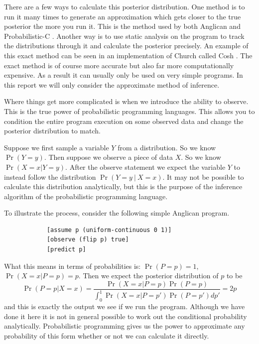\documentclass[a4paper]{article}
\begin{document}
There are a few ways to calculate this posterior distribution. One method is to run it many times to generate an approximation which gets closer to the true posterior the more you run it. This is the method used by both Anglican and Probabilistic-C \cite{Anglican, ProbabilisticC}. Another way is to use static analysis on the program to track the distributions through it and calculate the posterior precisely. An example of this exact method can be seen in an implementation of Church called Cosh \cite{Cosh}. The exact method is of course more accurate but also far more computationally expensive. As a result it can usually only be used on very simple programs. In this report we will only consider the approximate method of inference.

Where things get more complicated is when we introduce the ability to observe. This is the true power of probabilistic programming languages. This allows you to condition the entire program execution on some observed data and change the posterior distribution to match.

Suppose we first sample a variable \(Y\) from a distribution. So we know \(\Pr(Y = y)\). Then suppose we observe a piece of data \(X\). So we know \(\Pr(X = x | Y = y)\). After the observe statement we expect the variable \(Y\) to instead follow the distribution \(\Pr(Y = y\ |\ X = x)\). It may not be possible to calculate this distribution analytically, but this is the purpose of the inference algorithm of the probabilistic programming language.

To illustrate the process, consider the following simple Anglican program.

\begin{center}
	\begin{varwidth}{\linewidth}
		\small
		\begin{verbatim}
			[assume p (uniform-continuous 0 1)]
			[observe (flip p) true]
			[predict p]
		\end{verbatim}
	\end{varwidth}
\end{center}
What this means in terms of probabilities is: \(\Pr(P = p) = 1\), \(\Pr(X = x | P = p) = p\). Then we expect the posterior distribution of \(p\) to be
\[\Pr(P = p | X = x) = \frac{\Pr(X = x | P = p) \Pr(P = p)}{\int_0^1 \Pr(X = x | P = p') \Pr(P = p') dp'} = 2p\]
and this is exactly the output we see if we run the program. Although we have done it here it is not in general possible to work out the conditional probability analytically. Probabilistic programming gives us the power to approximate any probability of this form whether or not we can calculate it directly.
\end{document}
